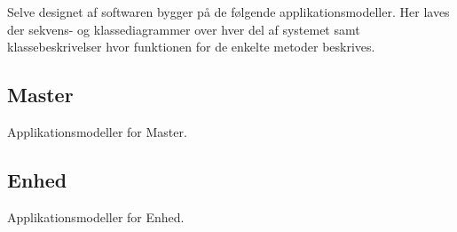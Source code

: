 
Selve designet af softwaren bygger på de følgende applikationsmodeller. Her laves der sekvens- og klassediagrammer over hver del af systemet samt klassebeskrivelser hvor funktionen for de enkelte metoder beskrives.

\subsection{Master}
Applikationsmodeller for Master.

\subsection{Enhed}
Applikationsmodeller for Enhed.